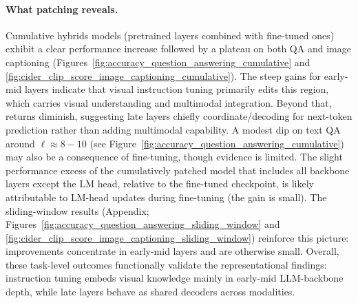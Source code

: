 \paragraph{What patching reveals.}
Cumulative hybrids models (pretrained layers combined with fine-tuned ones) exhibit a clear performance increase followed by a plateau on both QA and image captioning (Figures~\ref{fig:accuracy_question_answering_cumulative} and \ref{fig:cider_clip_score_image_captioning_cumulative}). The steep gains for early-mid layers indicate that visual instruction tuning primarily edits this region, which carries visual understanding and multimodal integration. Beyond that, returns diminish, suggesting late layers chiefly coordinate/decoding for next-token prediction rather than adding multimodal capability. A modest dip on text QA around $\ell \approx 8-10$ (see Figure~\ref{fig:accuracy_question_answering_cumulative}) may also be a consequence of fine-tuning, though evidence is limited. The slight performance excess of the cumulatively patched model that includes all backbone layers except the LM head, relative to the fine-tuned checkpoint, is likely attributable to LM-head updates during fine-tuning (the gain is small). The sliding-window results (Appendix; Figures~\ref{fig:accuracy_question_answering_sliding_window} and \ref{fig:cider_clip_score_image_captioning_sliding_window}) reinforce this picture: improvements concentrate in early-mid layers and are otherwise small. Overall, these task-level outcomes functionally validate the representational findings: instruction tuning embeds visual knowledge mainly in early-mid LLM-backbone depth, while late layers behave as shared decoders across modalities.
